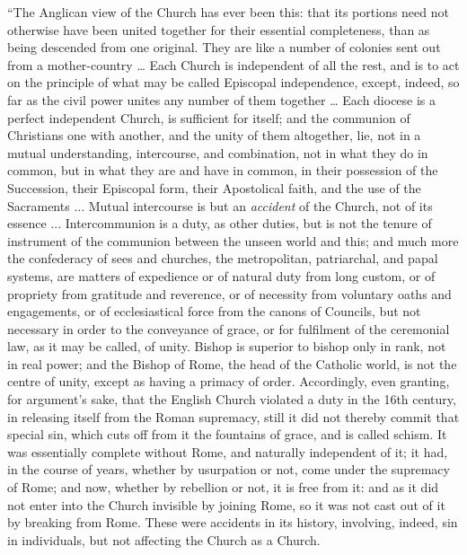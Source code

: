 ``The Anglican view of the Church has ever been this: that its
portions need not otherwise have been united together for their
essential completeness, than as being descended from one original.
They are like a number of colonies sent out from a mother-country …
Each Church is independent of all the rest, and is to act on the
principle of what may be called Episcopal independence, except,
indeed, so far as the civil power unites any number of them together
… Each diocese is a perfect independent Church, is sufficient for
itself; and the communion of Christians one with another, and the
unity of them altogether, lie, not in a mutual understanding,
intercourse, and combination, not in what they do in common, but in
what they are and have in common, in their possession of the
Succession, their Episcopal form, their Apostolical faith, and the use
of the Sacraments ... Mutual intercourse is but an \emph{accident} of
the Church, not of its essence ... Intercommunion is a duty, as other
duties, but is not the tenure of instrument of the communion
between the unseen world and this; and much more the confederacy of
sees and churches, the metropolitan, patriarchal, and papal systems,
are matters of expedience or of natural duty from long custom, or of
propriety from gratitude and reverence, or of necessity from voluntary
oaths and engagements, or of ecclesiastical force from the canons of
Councils, but not necessary in order to the conveyance of grace, or
for fulfilment of the ceremonial law, as it may be called, of unity.
Bishop is superior to bishop only in rank, not in real power; and the
Bishop of Rome, the head of the Catholic world, is not the centre of
unity, except as having a primacy of order. Accordingly, even
granting, for argument's sake, that the English Church violated a duty
in the 16th century, in releasing itself from the Roman supremacy,
still it did not thereby commit that special sin, which cuts off from
it the fountains of grace, and is called schism. It was essentially
complete without Rome, and naturally independent of it; it had, in the
course of years, whether by usurpation or not, come under the
supremacy of Rome; and now, whether by rebellion or not, it is free
from it: and as it did not enter into the Church invisible by joining
Rome, so it was not cast out of it by breaking from Rome. These were
accidents in its history, involving, indeed, sin in individuals, but
not affecting the Church as a Church.

